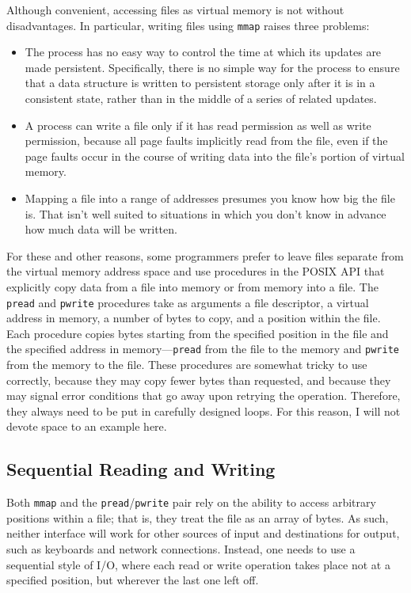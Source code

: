 Although convenient, accessing files as virtual memory is not without
disadvantages. In particular, writing files using \verb|mmap| raises
three problems:
\begin{itemize}
\item
The process has no easy way to control the time at which its updates
are made persistent.  Specifically, there is no simple way for the
process to ensure that a data structure is written to persistent storage only after
it is in a consistent state, rather than in the middle of a series of
related updates.
\item
A process can write a file only if it has read permission as well as
write permission, because all page faults implicitly read from the
file, even if the page faults occur in the course of writing data into
the file's portion of virtual memory.
\item
Mapping a file into a range of addresses presumes you know how big
the file is. That isn't well suited to situations in which you don't
know in advance how much data will be written.
\end{itemize}
For these and other reasons, some programmers prefer to leave files
separate from the virtual memory address space and use procedures in
the POSIX API that explicitly copy data from a file into memory or
from memory into a file.  The \verb|pread| and \verb|pwrite|
procedures take as arguments a file descriptor, a virtual address in
memory, a number of bytes to copy, and a position within the file.
Each procedure copies bytes starting from the specified position in the file and
the specified address in memory---\verb|pread| from the file to the
memory and \verb|pwrite| from the memory to the file.  These
procedures are somewhat tricky to use correctly, because they may copy
fewer bytes than requested, and because they may signal error
conditions that go away upon retrying the operation.
Therefore, they always need to be put in
carefully designed loops.  For this reason, I will not devote space
to an example here.

\subsection{Sequential Reading and Writing}\label{sequential-io-section}

Both \verb|mmap| and the \verb|pread|/\verb|pwrite| pair rely on the
ability to access arbitrary positions within a file; that is, they
treat the file as an array of bytes.  As such, neither interface will
work for other sources of input and destinations for output, such as
keyboards and network connections.  Instead, one needs to use a
sequential style of I/O, where each read or write operation takes
place not at a specified position, but wherever the last one
left off.

